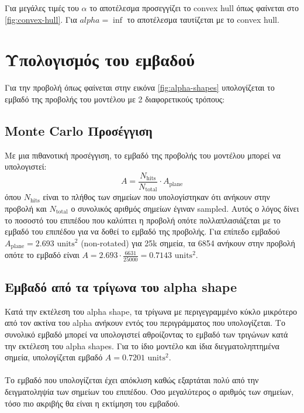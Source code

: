 \documentclass{report}
\begin{document}
 \label{fig:alpha-shapes}

 \label{fig:convex-hull}

Για μεγάλες τιμές του $\alpha$ το αποτέλεσμα προσεγγίζει το convex hull όπως φαίνεται στο \ref{fig:convex-hull}. Για
$alpha = \inf$ το αποτέλεσμα ταυτίζεται με το convex hull.


\section{Υπολογισμός του εμβαδού}
Για την προβολή όπως φαίνεται στην εικόνα \ref{fig:alpha-shapes} υπολογίζεται το εμβαδό της προβολής του μοντέλου 
με 2 διαφορετικούς τρόπους:
\subsection{Monte Carlo Προσέγγιση}
Με μια πιθανοτική προσέγγιση, το εμβαδό της προβολής του μοντέλου μπορεί να υπολογιστεί:
\begin{equation}
    A = \frac{N_{\text{hits}}}{N_{\text{total}}} \cdot A_{\text{plane}}
\end{equation}
όπου $N_{\text{hits}}$ είναι το πλήθος των σημείων που υπολογίστηκαν ότι ανήκουν στην προβολή και $N_{\text{total}}$
ο συνολικός αριθμός σημείων έγιναν sampled. Αυτός ο λόγος δίνει το ποσοστό του επιπέδου που καλύπτει η προβολή
οπότε πολλαπλασιάζεται με το εμβαδό του επιπέδου για να δοθεί το εμβαδό της προβολής.
Για επίπεδο εμβαδού $A_{\text{plane}} = 2.693 \text{ units}^2$ (non-rotated) για 25k σημεία, 
τα 6854 ανήκουν στην προβολή οπότε το εμβαδό είναι $A = 2.693 \cdot \frac{6631}{25000} = 0.7143 \text{ units}^2$.

\subsection{Εμβαδό από τα τρίγωνα του alpha shape}
Κατά την εκτέλεση του alpha shape, τα τρίγωνα με περιγεγραμμένο κύκλο μικρότερο από τον ακτίνα του alpha ανήκουν εντός
του περιγράμματος που υπολογίζεται. Το συνολικό εμβαδό μπορεί να υπολογιστεί αθροίζοντας το εμβαδό των τριγώνων
κατά την εκτέλεση του alpha shapes. Για το ίδιο μοντέλο και ίδια διεγματοληπτημένα σημεία, υπολογίζεται εμβαδό
$A = 0.7201 \text{ units}^2$.
\\\\
Το εμβαδό που υπολογίζεται έχει απόκλιση καθώς εξαρτάται πολύ από την δειγματοληψία των σημείων του επιπέδου.
Όσο μεγαλύτερος ο αριθμός των σημείων, τόσο πιο ακριβής θα είναι η εκτίμηση του εμβαδού.


\clearpage
{}
\end{document}
